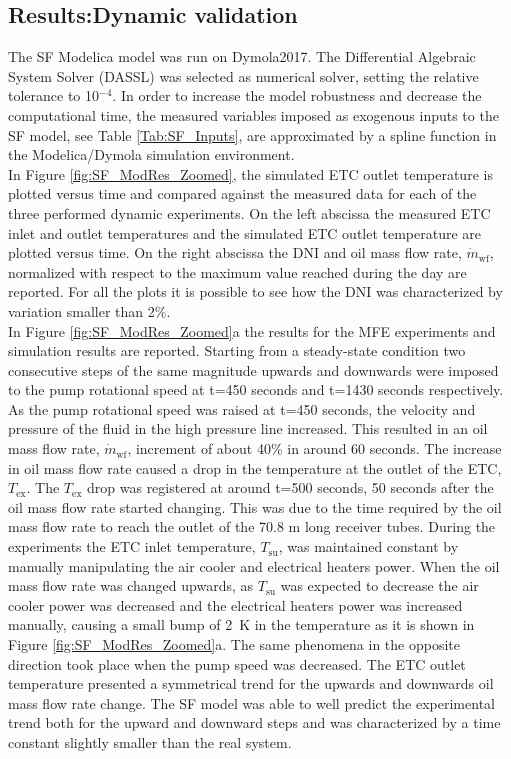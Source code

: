 \documentclass[final,3p,times,review]{elsarticle}
\begin{document}
\subsection{Results:Dynamic validation}
%
The SF Modelica model was run on Dymola2017. The Differential Algebraic System Solver (DASSL) \cite{Petzold1983} was selected as numerical solver, setting the relative tolerance to 10$^{-4}$. In order to increase the model robustness and decrease the computational time, the measured variables imposed as exogenous inputs to the SF model, see Table \ref{Tab:SF_Inputs}, are approximated by a spline function in the Modelica/Dymola simulation environment.\\
In Figure \ref{fig:SF_ModRes_Zoomed}, the simulated ETC outlet temperature is plotted versus time and compared against the measured data for each of the three performed dynamic experiments. On the left abscissa the measured ETC inlet and outlet temperatures and the simulated ETC outlet temperature are plotted versus time. On the right abscissa the DNI and oil mass flow rate, $\dot{m}_\mathrm{wf}$, normalized with respect to the maximum value reached during the day are reported. For all the plots it is possible to see how the DNI was characterized by variation smaller than 2\%.\\

In Figure \ref{fig:SF_ModRes_Zoomed}a the results for the MFE experiments and simulation results are reported. Starting from a steady-state condition two consecutive steps of the same magnitude upwards and downwards were imposed to the pump rotational speed at t=450 seconds and t=1430 seconds respectively. As the pump rotational speed was raised at t=450 seconds, the velocity and pressure of the fluid in the high pressure line increased. This resulted in an oil mass flow rate, $\dot{m}_\mathrm{wf}$, increment of about 40\% in around 60 seconds. The increase in oil mass flow rate caused a drop in the temperature at the outlet of the ETC, $T_\mathrm{ex}$. The $T_\mathrm{ex}$ drop was registered at around t=500 seconds, 50 seconds after the oil mass flow rate started changing. This was due to the time required by the oil mass flow rate to reach the outlet of the 70.8 m long receiver tubes. During the experiments the ETC inlet temperature, $T_\mathrm{su}$, was maintained constant  by manually manipulating the air cooler and electrical heaters power. 
When the oil mass flow rate was changed upwards, as $T_\mathrm{su}$ was expected to decrease the air cooler power was 
decreased and the electrical heaters power was increased manually, causing a small bump of 2~K in the temperature as it is shown in Figure \ref{fig:SF_ModRes_Zoomed}a.  
The same phenomena in the opposite direction took place when the pump speed was decreased. 
The ETC outlet temperature presented a symmetrical trend for the upwards and downwards oil mass flow rate change. The SF model was able to well predict the experimental trend both for the upward and downward steps and was characterized by a time constant slightly smaller than the real system.\\
\end{document}
